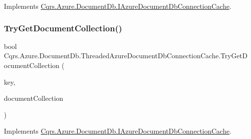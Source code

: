 Implements \hyperlink{interfaceCqrs_1_1Azure_1_1DocumentDb_1_1IAzureDocumentDbConnectionCache_ac2ab3e4a1c093f10d0b55634d4990ab2_ac2ab3e4a1c093f10d0b55634d4990ab2}{Cqrs.\+Azure.\+Document\+Db.\+I\+Azure\+Document\+Db\+Connection\+Cache}.

\mbox{\label{classCqrs_1_1Azure_1_1DocumentDb_1_1ThreadedAzureDocumentDbConnectionCache_a0986cecb40fc143751abb4605f507975_a0986cecb40fc143751abb4605f507975}} 
\subsubsection{\texorpdfstring{Try\+Get\+Document\+Collection()}{TryGetDocumentCollection()}}
{\footnotesize\ttfamily bool Cqrs.\+Azure.\+Document\+Db.\+Threaded\+Azure\+Document\+Db\+Connection\+Cache.\+Try\+Get\+Document\+Collection (\begin{DoxyParamCaption}\item[{string}]{key,  }\item[{out Document\+Collection}]{document\+Collection }\end{DoxyParamCaption})}



Implements \hyperlink{interfaceCqrs_1_1Azure_1_1DocumentDb_1_1IAzureDocumentDbConnectionCache_af74bf6c8dc009e0179edc20ef3158f03_af74bf6c8dc009e0179edc20ef3158f03}{Cqrs.\+Azure.\+Document\+Db.\+I\+Azure\+Document\+Db\+Connection\+Cache}.

